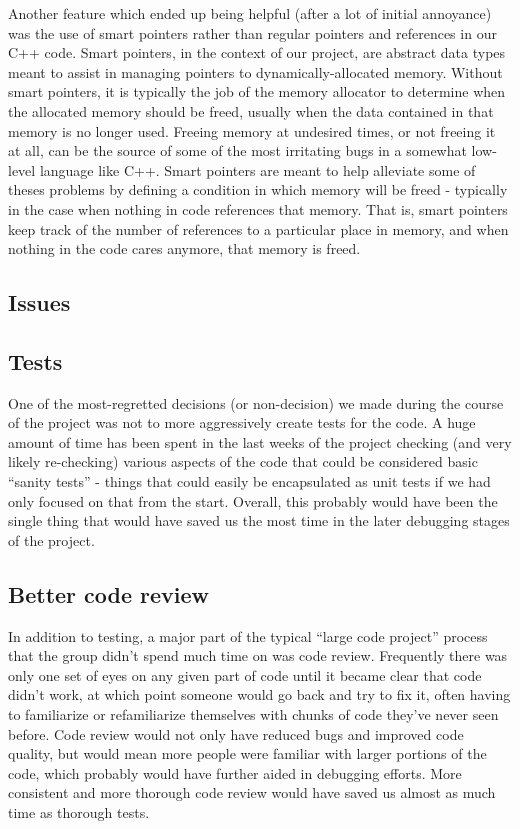 \documentclass[12pt]{article}
\begin{document}
Another feature which ended up being helpful (after a lot of initial annoyance) was the use of smart pointers rather than regular pointers and references in our C++ code. Smart pointers, in the context of our project, are abstract data types meant to assist in managing pointers to dynamically-allocated memory. Without smart pointers, it is typically the job of the memory allocator to determine when the allocated memory should be freed, usually when the data contained in that memory is no longer used. Freeing memory at undesired times, or not freeing it at all, can be the source of some of the most irritating bugs in a somewhat low-level language like C++. Smart pointers are meant to help alleviate some of theses problems by defining a condition in which memory will be freed - typically in the case when nothing in code references that memory. That is, smart pointers keep track of the number of references to a particular place in memory, and when nothing in the code cares anymore, that memory is freed.


\subsection{Issues}

\subsection*{Tests}

One of the most-regretted decisions (or non-decision) we made during the course of the project was not to more aggressively create tests for the code. A huge amount of time has been spent in the last weeks of the project checking (and very likely re-checking) various aspects of the code that could be considered basic “sanity tests” - things that could easily be encapsulated as unit tests if we had only focused on that from the start. Overall, this probably would have been the single thing that would have saved us the most time in the later debugging stages of the project.

\subsection*{Better code review}

In addition to testing, a major part of the typical “large code project” process that the group didn’t spend much time on was code review. Frequently there was only one set of eyes on any given part of code until it became clear that code didn’t work, at which point someone would go back and try to fix it, often having to familiarize or refamiliarize themselves with chunks of code they’ve never seen before. Code review would not only have reduced bugs and improved code quality, but would mean more people were familiar with larger portions of the code, which probably would have further aided in debugging efforts. More consistent and more thorough code review would have saved us almost as much time as thorough tests.
\end{document}
